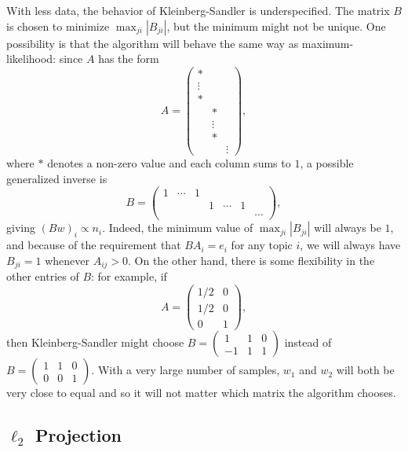 \documentclass{article}
\begin{document}
With less data, the behavior of Kleinberg-Sandler is underspecified.
The matrix \(B\) is chosen to minimize \(\max_{ji} |B_{ji}|\), but the minimum might not be unique.
One possibility is that the algorithm will behave the same way as maximum-likelihood: since \(A\) has the form
\[
    A =
    \begin{pmatrix}
        *      &        &
    \\  \vdots &        &
    \\  *      &        &
    \\         & *      &
    \\         & \vdots &
    \\         & *      &
    \\         &        & \vdots
    \end{pmatrix}
    ,
\]
    where \(*\) denotes a non-zero value and each column sums to \(1\), a possible generalized inverse is
\[
    B =
    \begin{pmatrix}
        1 & \cdots & 1 &   &        &   &
    \\    &        &   & 1 & \cdots & 1 &
    \\    &        &   &   &        &   & \cdots
    \end{pmatrix}
    ,
\]
    giving \((B w)_i \propto n_i\).
Indeed, the minimum value of \(\max_{ji} |B_{ji}|\) will always be \(1\), and because of the requirement that \(B A_i = e_i\) for any topic \(i\), we will always have \(B_{ji} = 1\) whenever \(A_{ij} > 0\).
On the other hand, there is some flexibility in the other entries of \(B\): for example, if
\[
    A =
    \begin{pmatrix}
        1/2 & 0
    \\  1/2 & 0
    \\  0   & 1
    \end{pmatrix}
    ,
\]
    then Kleinberg-Sandler might choose
\(
    B =
    \begin{pmatrix}
         1 & 1 & 0
    \\  -1 & 1 & 1
    \end{pmatrix}
\)
instead of
\(
    B =
    \begin{pmatrix}
        1 & 1 & 0
    \\  0 & 0 & 1
    \end{pmatrix}
\).
With a very large number of samples, \(w_1\) and \(w_2\) will both be very close to equal and so it will not matter which matrix the algorithm chooses.

\subsection{\(\ell_2\) Projection}
\end{document}
